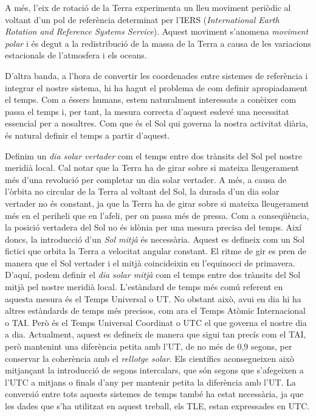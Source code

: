 \documentclass{article}
\begin{document}
A més, l'eix de rotació de la Terra experimenta un lleu moviment periòdic al voltant d'un pol de referència determinat per l'IERS (\emph{International Earth Rotation and Reference Systems Service}). Aquest moviment s'anomena \emph{moviment polar} i és degut a la redistribució de la massa de la Terra a causa de les variacions estacionals de l'atmosfera i els oceans.

D'altra banda, a l'hora de convertir les coordenades entre sistemes de referència i integrar el nostre sistema, hi ha hagut el problema de com definir apropiadament el temps. Com a éssers humans, estem naturalment interessats a conèixer com passa el temps i, per tant, la mesura correcta d'aquest esdevé una necessitat essencial per a nosaltres. Com que és el Sol qui governa la nostra activitat diària, és natural definir el temps a partir d'aquest.

Definim un \emph{dia solar vertader} com el temps entre dos trànsits del Sol pel nostre meridià local. Cal notar que la Terra ha de girar sobre si mateixa lleugerament més d'una revolució per completar un dia solar vertader. A més, a causa de l'òrbita no circular de la Terra al voltant del Sol, la durada d'un dia solar vertader no és constant, ja que la Terra ha de girar sobre si mateixa lleugerament més en el periheli que en l'afeli, per on passa més de pressa. Com a conseqüència, la posició vertadera del Sol no és idònia per una mesura precisa del temps. Així doncs, la introducció d'un \emph{Sol mitjà} és necessària. Aquest es defineix com un Sol fictici que orbita la Terra a velocitat angular constant. El ritme de gir es pren de manera que el Sol vertader i el mitjà coincideixin en l'equinocci de primavera. D'aquí, podem definir el \emph{dia solar mitjà} com el temps entre dos trànsits del Sol mitjà pel nostre meridià local. L'estàndard de temps més comú referent en aquesta mesura és el Temps Universal o UT. No obstant això, avui en dia hi ha altres estàndards de temps més precisos, com ara el Temps Atòmic Internacional o TAI. Però és el Temps Universal Coordinat o UTC el que governa el nostre dia a dia. Actualment, aquest es defineix de manera que sigui tan precís com el TAI, però mantenint una diferència petita amb l'UT, de no més de 0,9 segons, per conservar la coherència amb el \emph{rellotge solar}. Els científics aconsegueixen això mitjançant la introducció de segons intercalars, que són segons que s'afegeixen a l'UTC a mitjans o finals d'any per mantenir petita la diferència amb l'UT. La conversió entre tots aquests sistemes de temps també ha estat necessària, ja que les dades que s'ha utilitzat en aquest treball, els TLE, estan expressades en UTC.
\end{document}
